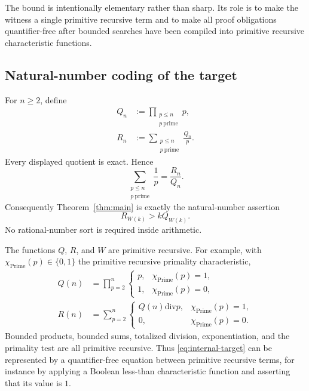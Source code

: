 \documentclass[11pt]{article}
\theoremstyle{definition}
\newcommand{\Prime}{\operatorname{Prime}}
\newcommand{\ProdP}{Q}
\newcommand{\NumP}{R}
\newcommand{\Wit}{W}
\begin{document}
The bound is intentionally elementary rather than sharp.  Its role is to make
the witness a single primitive recursive term and to make all proof
obligations quantifier-free after bounded searches have been compiled into
primitive recursive characteristic functions.

\subsection{Natural-number coding of the target}

For \(n\geq 2\), define
\begin{align*}
  \ProdP_n &:= \prod_{\substack{p\leq n\\p\ \mathrm{prime}}}p,\\
  \NumP_n &:= \sum_{\substack{p\leq n\\p\ \mathrm{prime}}}\frac{\ProdP_n}{p}.
\end{align*}
Every displayed quotient is exact.  Hence
\[
  \sum_{\substack{p\leq n\\p\ \mathrm{prime}}}\frac1p
  =\frac{\NumP_n}{\ProdP_n}.
\]
Consequently Theorem~\ref{thm:main} is exactly the natural-number assertion
\begin{equation}\label{eq:internal-target}
  \NumP_{\Wit(k)}>k\ProdP_{\Wit(k)}.
\end{equation}
No rational-number sort is required inside arithmetic.

The functions \(\ProdP\), \(\NumP\), and \(\Wit\) are primitive recursive.
For example, with \(\chi_{\Prime}(p)\in\{0,1\}\) the primitive recursive
primality characteristic,
\begin{align*}
 \ProdP(n)&=\prod_{p=2}^{n}
    \begin{cases}p,&\chi_{\Prime}(p)=1,\\1,&\chi_{\Prime}(p)=0,\end{cases}\\
 \NumP(n)&=\sum_{p=2}^{n}
    \begin{cases}\ProdP(n)\mathbin{\mathrm{div}}p,&\chi_{\Prime}(p)=1,\\0,&\chi_{\Prime}(p)=0.
    \end{cases}
\end{align*}
Bounded products, bounded sums, totalized division, exponentiation, and the
primality test are all primitive recursive.  Thus
\eqref{eq:internal-target} can be represented by a quantifier-free equation
between primitive recursive terms, for instance by applying a Boolean
less-than characteristic function and asserting that its value is \(1\).
\end{document}
